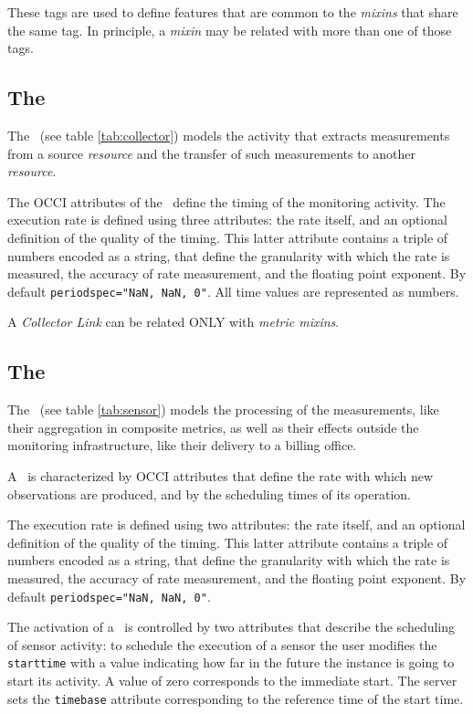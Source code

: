 \documentclass[10pt]{article}  %
\begin{document}
These tags are used to define features that are common to the {\em mixins} that share the same tag. In principle, a {\em mixin} may be related with more than one of those tags. 

\subsection{The \coll}



The \coll\ (see table \ref{tab:collector}) models the activity that extracts measurements from a source {\em resource} and the transfer of such measurements to another {\em resource}.

The OCCI attributes of the \coll\ define the timing of the monitoring activity.
The execution rate is defined using three attributes: the rate itself, and an optional definition of the quality of the timing. This latter attribute contains a triple of numbers encoded as a string, that define the granularity with which the rate is measured, the accuracy of rate measurement, and the floating point exponent. By default \verb|periodspec="NaN, NaN, 0"|. All time values are represented as numbers.

A {\em Collector Link} can be related ONLY with {\em metric mixins}.

\subsection{The \sens \label{sec:sensor}}



The \sens\ (see table \ref{tab:sensor}) models the processing of the measurements, like their aggregation in composite metrics, as well as their effects outside the monitoring infrastructure, like their delivery to a billing office.

A \sens\ is characterized by OCCI attributes that define the rate with which new observations are produced, and by the scheduling times of its operation.

The execution rate is defined using two attributes: the rate itself, and an optional definition of the quality of the timing. This latter attribute contains a triple of numbers encoded as a string, that define the granularity with which the rate is measured, the accuracy of rate measurement, and the floating point exponent. By default \verb|periodspec="NaN, NaN, 0"|.

The activation of a \sens\ is controlled by two attributes that describe the scheduling of sensor activity: to schedule the execution of a sensor the user modifies the {\tt starttime} with a value indicating how far in the future the instance is going to start its activity. A value of zero corresponds to the immediate start. The server sets the {\tt timebase} attribute corresponding to the reference time of the start time.
\end{document}
